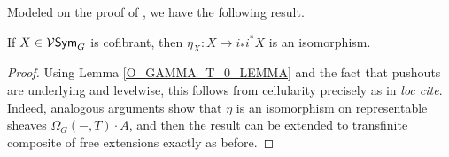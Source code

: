\documentclass[a4paper,10pt]{article}%
\begin{document}

Modeled on the proof of \cite[Theorem 2.10]{Ste16}, we have the following result.
\begin{proposition}
  If $X\in \mathcal V\mathsf{Sym}_G$ is cofibrant, then $\eta_X: X \to i_*i^*X$ is an isomorphism.
\end{proposition}
\begin{proof}
  Using Lemma \ref{O_GAMMA_T_0_LEMMA} and the fact that pushouts are underlying and levelwise, this follows from cellularity precisely as in \textit{loc cite}. Indeed, analogous arguments show that $\eta$ is an isomorphism on representable sheaves $\Omega_G(-,T)\cdot A$, and then the result can be extended to transfinite composite of free extensions exactly as before.

\end{proof}
\end{document}
